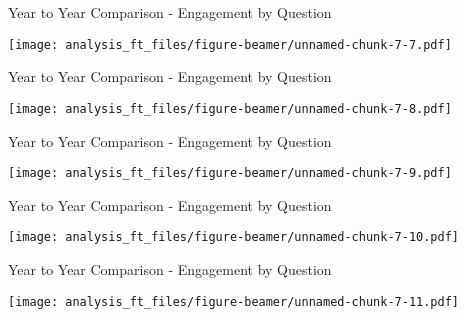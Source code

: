 \documentclass[handout]{beamer}
\begin{document}
\begin{frame}{Year to Year Comparison - Engagement by Question}
\protect\hypertarget{year-to-year-comparison---engagement-by-question-6}{}

\texttt{[image: analysis\_ft\_files/figure-beamer/unnamed-chunk-7-7.pdf]}

\end{frame}

\begin{frame}{Year to Year Comparison - Engagement by Question}
\protect\hypertarget{year-to-year-comparison---engagement-by-question-7}{}

\texttt{[image: analysis\_ft\_files/figure-beamer/unnamed-chunk-7-8.pdf]}

\end{frame}

\begin{frame}{Year to Year Comparison - Engagement by Question}
\protect\hypertarget{year-to-year-comparison---engagement-by-question-8}{}

\texttt{[image: analysis\_ft\_files/figure-beamer/unnamed-chunk-7-9.pdf]}

\end{frame}

\begin{frame}{Year to Year Comparison - Engagement by Question}
\protect\hypertarget{year-to-year-comparison---engagement-by-question-9}{}

\texttt{[image: analysis\_ft\_files/figure-beamer/unnamed-chunk-7-10.pdf]}

\end{frame}

\begin{frame}{Year to Year Comparison - Engagement by Question}
\protect\hypertarget{year-to-year-comparison---engagement-by-question-10}{}

\texttt{[image: analysis\_ft\_files/figure-beamer/unnamed-chunk-7-11.pdf]}

\end{frame}
\end{document}
